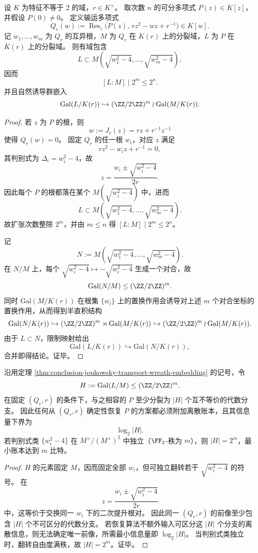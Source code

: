 \begin{theorem}\label{thm:conclusion-joukowsky-transport-wreath-embedding}
设 \(K\) 为特征不等于 \(2\) 的域，\(r\in K^\times\)。
取次数 \(n\) 的可分多项式 \(P(z)\in K[z]\)，并假设 \(P(0)\neq 0\)。
定义输运多项式
\[
Q_r(w):=\operatorname{Res}_z\!\bigl(P(z),\,r z^2-wz+r^{-1}\bigr)\in K[w].
\]
记 \(w_1,\dots,w_m\) 为 \(Q_r\) 的互异根，\(M\) 为 \(Q_r\) 在 \(K(r)\) 上的分裂域，\(L\) 为 \(P\) 在 \(K(r)\) 上的分裂域。
则有域包含
\[
L\subset
M\!\left(\sqrt{w_1^2-4},\dots,\sqrt{w_m^2-4}\right),
\]
因而
\[
[L:M]\mid 2^m\le 2^n.
\]
并且自然诱导群嵌入
\[
\mathrm{Gal}(L/K(r))
\hookrightarrow
(\ZZ/2\ZZ)^m\wr \mathrm{Gal}(M/K(r)).
\]
\end{theorem}
\begin{proof}
若 \(z\) 为 \(P\) 的根，则
\[
w:=J_r(z)=rz+r^{-1}z^{-1}
\]
使得 \(Q_r(w)=0\)。
固定 \(Q_r\) 的任一根 \(w_i\)，对应 \(z\) 满足
\[
r z^2-w_i z+r^{-1}=0,
\]
其判别式为 \(\Delta_i=w_i^2-4\)，故
\[
z=\frac{w_i\pm\sqrt{w_i^2-4}}{2r}.
\]
因此每个 \(P\) 的根都落在某个
\(
M(\sqrt{w_i^2-4})
\)
中，进而
\[
L\subset M\!\left(\sqrt{w_1^2-4},\dots,\sqrt{w_m^2-4}\right).
\]
故扩张次数整除 \(2^m\)，并由 \(m\le n\) 得 \([L:M]\mid 2^m\le 2^n\)。

记
\[
N:=M\!\left(\sqrt{w_1^2-4},\dots,\sqrt{w_m^2-4}\right).
\]
在 \(N/M\) 上，每个 \(\sqrt{w_i^2-4}\mapsto -\sqrt{w_i^2-4}\) 生成一个对合，故
\[
\mathrm{Gal}(N/M)\le (\ZZ/2\ZZ)^m.
\]
同时 \(\mathrm{Gal}(M/K(r))\) 在根集 \(\{w_i\}\) 上的置换作用会诱导对上述 \(m\) 个对合坐标的置换作用，从而得到半直积结构
\[
\mathrm{Gal}(N/K(r))
\hookrightarrow
(\ZZ/2\ZZ)^m\rtimes \mathrm{Gal}(M/K(r))
\hookrightarrow
(\ZZ/2\ZZ)^m\wr \mathrm{Gal}(M/K(r)).
\]
由于 \(L\subset N\)，限制映射给出
\[
\mathrm{Gal}(L/K(r))\hookrightarrow \mathrm{Gal}(N/K(r)),
\]
合并即得结论。证毕。
\end{proof}

\begin{corollary}[输运全息的最小离散账本下界]\label{cor:conclusion-joukowsky-discrete-ledger-lower-bound}
沿用定理 \ref{thm:conclusion-joukowsky-transport-wreath-embedding} 的记号，令
\[
H:=\mathrm{Gal}(L/M)\le (\ZZ/2\ZZ)^m.
\]
在固定 \((Q_r,r)\) 的条件下，与之相容的 \(P\) 至少分裂为 \(|H|\) 个互不等价的代数分支。
因此任何从 \((Q_r,r)\) 确定性恢复 \(P\) 的方案都必须附加离散账本，且其信息量下界为
\[
\log_2|H|.
\]
若判别式类 \(\{w_i^2-4\}\) 在 \(M^\times/(M^\times)^2\) 中独立（\(\FF_2\)-秩为 \(m\)），则 \(|H|=2^m\)，最小账本达到 \(m\) 比特。
\end{corollary}
\begin{proof}
\(H\) 的元素固定 \(M\)，因而固定全部 \(w_i\)，但可独立翻转若干 \(\sqrt{w_i^2-4}\) 的符号。
在
\[
z=\frac{w_i\pm\sqrt{w_i^2-4}}{2r}
\]
中，这等价于交换同一 \(w_i\) 下的二次提升根对。
因此同一 \((Q_r,r)\) 的前像至少包含 \(|H|\) 个不可区分的代数分支。
若恢复算法不额外输入可区分这 \(|H|\) 个分支的离散信息，则无法确定唯一前像，所需最小信息量即 \(\log_2|H|\)。
当判别式类独立时，翻转自由度满秩，故 \(|H|=2^m\)。证毕。
\end{proof}

